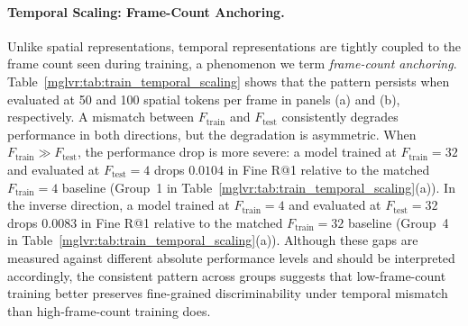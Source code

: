 \FloatBarrier
\paragraph{Temporal Scaling: Frame-Count Anchoring.}
Unlike spatial representations, temporal representations are tightly coupled to the frame count seen during training, a phenomenon we term \textit{frame-count anchoring}. Table~\ref{mglvr:tab:train_temporal_scaling} shows that the pattern persists when evaluated at 50 and 100 spatial tokens per frame in panels (a) and (b), respectively. A mismatch between $F_{\text{train}}$ and $F_{\text{test}}$ consistently degrades performance in both directions, but the degradation is asymmetric. When $F_{\text{train}} \gg F_{\text{test}}$, the performance drop is more severe: a model trained at $F_{\text{train}} = 32$ and evaluated at $F_{\text{test}} = 4$ drops $0.0104$ in Fine R@1 relative to the matched $F_{\text{train}} = 4$ baseline (Group~1 in Table~\ref{mglvr:tab:train_temporal_scaling}(a)). In the inverse direction, a model trained at $F_{\text{train}} = 4$ and evaluated at $F_{\text{test}} = 32$ drops $0.0083$ in Fine R@1 relative to the matched $F_{\text{train}} = 32$ baseline (Group~4 in Table~\ref{mglvr:tab:train_temporal_scaling}(a)). Although these gaps are measured against different absolute performance levels and should be interpreted accordingly, the consistent pattern across groups suggests that low-frame-count training better preserves fine-grained discriminability under temporal mismatch than high-frame-count training does.

